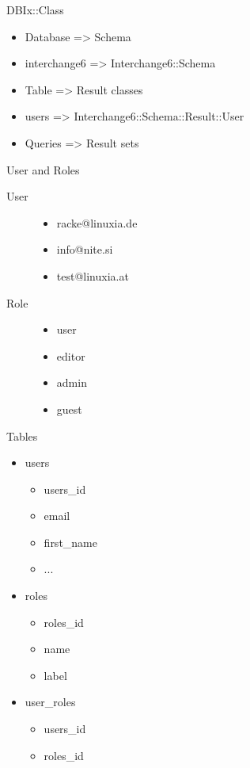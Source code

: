 \begin{frame}{DBIx::Class}
\begin{itemize}
\item Database => Schema
\item interchange6 => Interchange6::Schema
\end{itemize}
\begin{itemize}
\item Table => Result classes
\item users => Interchange6::Schema::Result::User
\end{itemize}
\begin{itemize}
\item Queries => Result sets
\end{itemize}
\end{frame}

\begin{frame}{User and Roles}
\begin{description}
\item[User]
\begin{itemize}
\item racke@linuxia.de
\item info@nite.si
\item test@linuxia.at
\end{itemize}
\item[Role]
\begin{itemize}
\item user
\item editor
\item admin
\item guest
\end{itemize}
\end{description}
\end{frame}

\begin{frame}{Tables}
\begin{itemize}
\item users
\begin{itemize}
\item users\_id
\item email
\item first\_name
\item ...
\end{itemize}
\item roles
\begin{itemize}
\item roles\_id
\item name
\item label
\end{itemize}
\item user\_roles
\begin{itemize}
\item users\_id
\item roles\_id
\end{itemize}
\end{itemize}
\end{frame}

